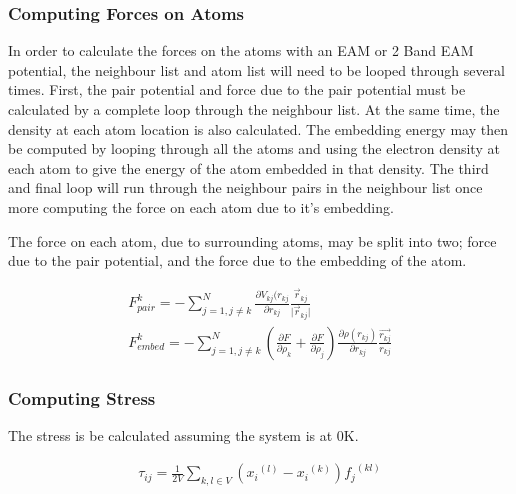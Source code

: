 \subsubsection{Computing Forces on Atoms}

In order to calculate the forces on the atoms with an EAM or 2 Band EAM potential, the neighbour list and atom list will need to be looped through several times.  First, the pair potential and force due to the pair potential must be calculated by a complete loop through the neighbour list.  At the same time, the density at each atom location is also calculated.  The embedding energy may then be computed by looping through all the atoms and using the electron density at each atom to give the energy of the atom embedded in that density.  The third and final loop will run through the neighbour pairs in the neighbour list once more computing the force on each atom due to it's embedding.

The force on each atom, due to surrounding atoms, may be split into two; force due to the pair potential, and the force due to the embedding of the atom\cite{dlpolymanual}.

\begin{equation}
\begin{split}
F^k_{pair} = -\sum \limits_{j=1, j \ne k}^{N} \frac{\partial V_{kj} (r_{kj}}{\partial r_{kj}} \frac{\vec{r}_{kj}}{\lvert\vec{r}_{kj}\lvert} \\
F^k_{embed} = -\sum \limits_{j=1, j \ne k}^{N} \left(\frac{\partial F}{\partial \rho_k} + \frac{\partial F}{\partial \rho_j} \right) \frac{\partial \rho (r_{kj})}{\partial r_{kj}} \frac{\vec{r_{kj}}}{r_{kj}}
\end{split}
\label{eq:eqLennardJones}
\end{equation}


\subsubsection{Computing Stress}

The stress is be calculated assuming the system is at 0K\cite{wikivirialstress}.

\begin{equation}
\begin{split}
\tau_{ij} = \frac{1}{2 V} \sum_{k,l \in V} \left({x_i}^{(l)} - {x_i}^{(k)} \right) {f_j}^{(kl)}
\end{split}
\label{eq:eqVirialStress}
\end{equation}


